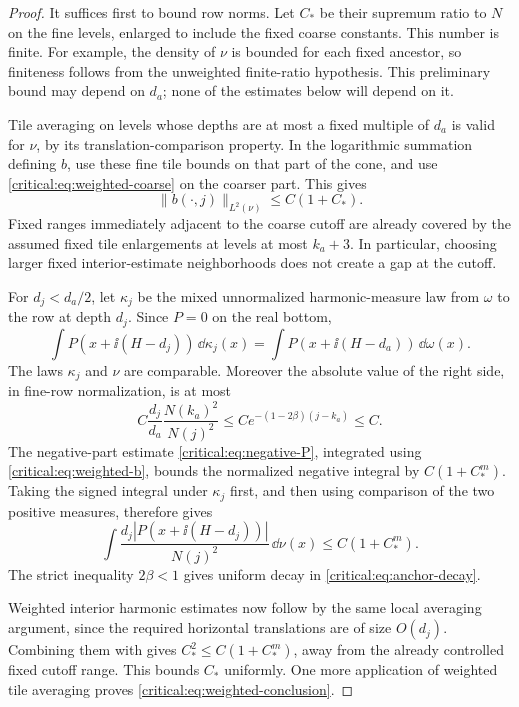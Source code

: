 \begin{proof}
It suffices first to bound row norms. Let \(C_*\) be their supremum
ratio to \(N\) on the fine levels, enlarged to include the fixed
coarse constants. This number is finite. For example, the density of
\(\nu\) is bounded for each fixed ancestor, so finiteness follows
from the unweighted finite-ratio hypothesis. This preliminary bound
may depend on \(d_a\); none of the estimates below will depend on it.

Tile averaging on levels whose depths are at most a fixed multiple
of \(d_a\) is valid for \(\nu\), by its translation-comparison
property. In the logarithmic summation defining \(b\), use these
fine tile bounds on that part of the cone, and use
\eqref{critical:eq:weighted-coarse} on the coarser part. This gives
\begin{equation}\label{critical:eq:weighted-b}
 \|b(\cdot,j)\|_{L^2(\nu)}\le C(1+C_*).
\end{equation}
Fixed ranges immediately adjacent to the coarse cutoff are already
covered by the assumed fixed tile enlargements at levels at most
\(k_a+3\). In particular, choosing larger fixed interior-estimate
neighborhoods does not create a gap at the cutoff.

For \(d_j<d_a/2\), let \(\kappa_j\) be the mixed unnormalized
harmonic-measure law from \(\omega\) to the row at depth \(d_j\).
Since \(P=0\) on the real bottom,
\[
 \int P(x+\ii(H-d_j))\,\dd\kappa_j(x)
   =\int P(x+\ii(H-d_a))\,\dd\omega(x).
\]
The laws \(\kappa_j\) and \(\nu\) are comparable. Moreover the
absolute value of the right side, in fine-row normalization, is at
most
\begin{equation}\label{critical:eq:anchor-decay}
 C\frac{d_j}{d_a}\frac{N(k_a)^2}{N(j)^2}
 \le C e^{-(1-2\beta)(j-k_a)}\le C.
\end{equation}
The negative-part estimate \eqref{critical:eq:negative-P}, integrated
using \eqref{critical:eq:weighted-b}, bounds the normalized negative
integral by \(C(1+C_*^m)\). Taking the signed integral under
\(\kappa_j\) first, and then using comparison of the two positive
measures, therefore gives
\[
 \int\frac{d_j|P(x+\ii(H-d_j))|}{N(j)^2}\,\dd\nu(x)
 \le C(1+C_*^m).
\]
The strict inequality \(2\beta<1\) gives uniform decay in
\eqref{critical:eq:anchor-decay}.

Weighted interior harmonic estimates now follow by the same local
averaging argument, since the required horizontal translations are
of size \(O(d_j)\). Combining them with
 gives
\(C_*^2\le C(1+C_*^m)\), away from the already controlled fixed
cutoff range. This bounds \(C_*\) uniformly. One more application of
weighted tile averaging proves \eqref{critical:eq:weighted-conclusion}.
\end{proof}

